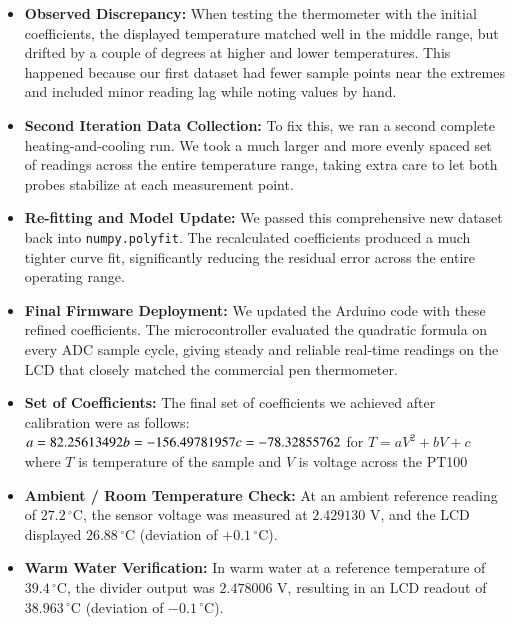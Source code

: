 \documentclass[journal,12pt,onecolumn]{IEEEtran}
\begin{document}
\begin{enumerate}
\begin{itemize}
	\item \textbf{Observed Discrepancy:} When testing the thermometer with the initial coefficients, the displayed temperature matched well in the middle range, but drifted by a couple of degrees at higher and lower temperatures. This happened because our first dataset had fewer sample points near the extremes and included minor reading lag while noting values by hand.
	
	\item \textbf{Second Iteration Data Collection:} To fix this, we ran a second complete heating-and-cooling run. We took a much larger and more evenly spaced set of readings across the entire temperature range, taking extra care to let both probes stabilize at each measurement point.
	
	\item \textbf{Re-fitting and Model Update:} We passed this comprehensive new dataset back into \texttt{numpy.polyfit}. The recalculated coefficients produced a much tighter curve fit, significantly reducing the residual error across the entire operating range.
	
	\item \textbf{Final Firmware Deployment:} We updated the Arduino code with these refined coefficients. The microcontroller evaluated the quadratic formula on every ADC sample cycle, giving steady and reliable real-time readings on the LCD that closely matched the commercial pen thermometer.

    \item \textbf{Set of Coefficients:} The final set of coefficients we achieved after calibration were as follows: \newline
    $a= 82.25613492 \\
    b= -156.49781957 \\
    c = -78.32855762 \\$
    for $T= aV^2 + bV + c$ where $T$ is temperature of the sample and $V$ is voltage across the PT100 

    \item \textbf{Ambient / Room Temperature Check:} At an ambient reference reading of $27.2\,^\circ\text{C}$, the sensor voltage was measured at $2.429130\text{ V}$, and the LCD displayed $26.88\,^\circ\text{C}$ (deviation of $+0.1\,^\circ\text{C}$).
	
	\item \textbf{Warm Water Verification:} In warm water at a reference temperature of $39.4\,^\circ\text{C}$, the divider output was $2.478006\text{ V}$, resulting in an LCD readout of $38.963\,^\circ\text{C}$ (deviation of $-0.1\,^\circ\text{C}$).
	

\end{itemize}
\end{enumerate}
\end{document}
